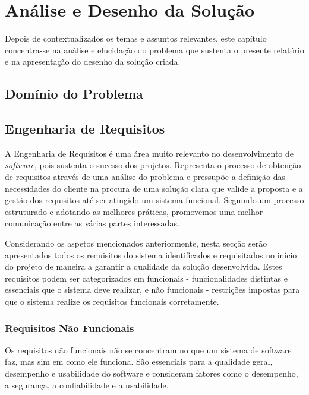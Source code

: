 \chapter{Análise e Desenho da Solução}
\label{sec:3-Analise}

Depois de contextualizados os temas e assuntos relevantes, este capítulo concentra-se
na análise e elucidação do problema que sustenta o presente relatório e na apresentação do
desenho da solução criada.

\section{Domínio do Problema}


\section{Engenharia de Requisitos}

A Engenharia de Requisitos é uma área muito relevanto no desenvolvimento de \textit{software}, pois 
sustenta o sucesso dos projetos. Representa o processo de obtenção de requisitos através de uma análise 
do problema e pressupõe a definição das necessidades do cliente na procura de uma solução clara 
que valide a proposta e a gestão dos requisitos até ser atingido um sistema funcional. Seguindo um 
processo estruturado e adotando as melhores práticas, promovemos uma melhor comunicação entre as 
várias partes interessadas.

Considerando os aspetos mencionados anteriormente, nesta secção serão apresentados todos os 
requisitos do sistema identificados e requisitados no início do projeto de maneira a garantir a 
qualidade da solução desenvolvida. Estes requisitos podem ser categorizados em funcionais - 
funcionalidades distintas e essenciais que o sistema deve realizar, e não funcionais - 
restrições impostas para que o sistema realize os requisitos funcionais corretamente.

\subsection{Requisitos Não Funcionais}

Os requisitos não funcionais não se concentram no que um sistema de software faz, mas sim em como 
ele funciona. São essenciais para a qualidade geral, desempenho e usabilidade do software e 
consideram fatores como o desempenho, a segurança, a confiabilidade e a usabilidade.

